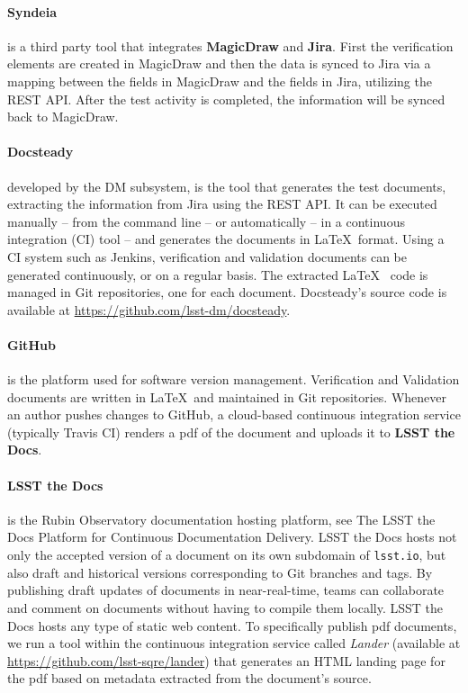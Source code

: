 \paragraph{Syndeia}
is a third party tool that integrates \textbf{MagicDraw} and \textbf{Jira}. 
First the verification elements are created in MagicDraw and then the data is synced to Jira
via a mapping between the fields in MagicDraw and the fields in Jira, utilizing the REST API.
After the test activity is completed, the information will be synced back to MagicDraw.

\paragraph{Docsteady}
developed by the DM subsystem, is the tool that generates the test documents, extracting the information from Jira using the REST API.
It can be executed manually -- from the command line -- or automatically -- in a continuous integration (CI) tool -- and generates the documents in \LaTeX~format.
Using a CI system such as Jenkins, verification and validation documents can be generated continuously, or on a regular basis.
The extracted \LaTeX~ code is managed in Git repositories, one for each document.
Docsteady's source code is available at \url{https://github.com/lsst-dm/docsteady}.

\paragraph{GitHub}
is the platform used for software version management.
Verification and Validation documents are written in \LaTeX~and maintained in Git repositories.
Whenever an author pushes changes to GitHub, a cloud-based continuous integration service 
(typically Travis CI) renders a pdf of the document and uploads it to \textbf{LSST the Docs}.

\paragraph{LSST the Docs}
is the Rubin Observatory documentation hosting platform, see The LSST the Docs Platform for Continuous Documentation Delivery\cite{SQR-006}.
LSST the Docs hosts not only the accepted version of a document on its own subdomain of \texttt{lsst.io}, but also draft and
historical versions corresponding to Git branches and tags.
By publishing draft updates of documents in near-real-time, teams can collaborate and comment on documents without having to
compile them locally.
LSST the Docs hosts any type of static web content.
To specifically publish pdf documents, we run a tool within the continuous integration service called \textit{Lander}
(available at \url{https://github.com/lsst-sqre/lander})
that generates an HTML landing page for the pdf based on metadata extracted from the document's source.

